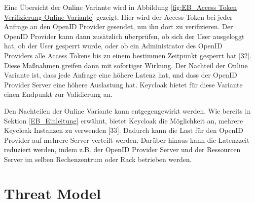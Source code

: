 Eine Übersicht der Online Variante wird in Abbildung \ref{fig:EB_Access Token Verifizierung Online Variante} gezeigt. Hier wird der Access Token bei jeder Anfrage an den OpenID Provider gesendet, um ihn dort zu verifizieren. Der OpenID Provider kann dann zusätzlich überprüfen, ob sich der User ausgeloggt hat, ob der User gesperrt wurde, oder ob ein Administrator des OpenID Providers alle Access Tokens bis zu einem bestimmen Zeitpunkt gesperrt hat [32]. Diese Maßnahmen greifen dann mit sofortiger Wirkung. Der Nachteil der Online Variante ist, dass jede Anfrage eine höhere Latenz hat, und dass der OpenID Provider Server eine höhere Auslastung hat. Keycloak bietet für diese Variante einen Endpunkt zur Validierung an. 

Den Nachteilen der Online Variante kann entgegengewirkt werden. Wie bereits in Sektion \ref{EB_Einleitung} erwähnt, bietet Keycloak die Möglichkeit an, mehrere Keycloak Instanzen zu verwenden [33]. Dadurch kann die Last für den OpenID Provider auf mehrere Server verteilt werden. Darüber hinaus kann die Latenzzeit reduziert werden, indem z.B. der OpenID Provider Server und der Ressourcen Server im selben Rechenzentrum oder Rack betrieben werden.







\section{Threat Model}

















